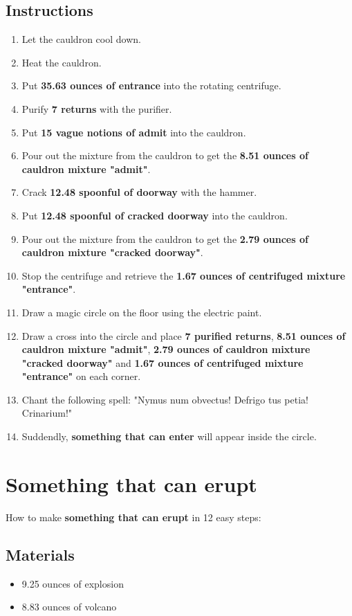 \documentclass{article}
\begin{document}
\subsection{Instructions}\begin{enumerate}
\item 
Let the cauldron cool down.
\item 
Heat the cauldron.
\item 
Put \textbf{35.63 ounces of entrance} into the rotating centrifuge.
\item 
Purify \textbf{7 returns} with the purifier.
\item 
Put \textbf{15 vague notions of admit} into the cauldron.
\item 
Pour out the mixture from the cauldron to get the \textbf{8.51 ounces of cauldron mixture "admit"}.
\item 
Crack \textbf{12.48 spoonful of doorway} with the hammer.
\item 
Put \textbf{12.48 spoonful of cracked doorway} into the cauldron.
\item 
Pour out the mixture from the cauldron to get the \textbf{2.79 ounces of cauldron mixture "cracked doorway"}.
\item 
Stop the centrifuge and retrieve the \textbf{1.67 ounces of centrifuged mixture "entrance"}.
\item 
Draw a magic circle on the floor using the electric paint.
\item 
Draw a cross into the circle and place \textbf{7 purified returns}, \textbf{8.51 ounces of cauldron mixture "admit"}, \textbf{2.79 ounces of cauldron mixture "cracked doorway"} and \textbf{1.67 ounces of centrifuged mixture "entrance"} on each corner.
\item 
Chant the following spell: "Nymus num obvectus! Defrigo tus petia! Crinarium!"
\item 
Suddendly, \textbf{something that can enter} will appear inside the circle.
\end{enumerate}
\newpage
\section{Something that can erupt}How to make \textbf{something that can erupt} in 12 easy steps:

\subsection{Materials}\begin{itemize}
\item 
9.25 ounces of explosion
\item 
8.83 ounces of volcano
\end{itemize}
\end{document}
